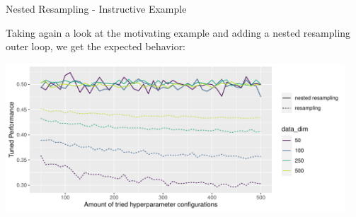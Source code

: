 \documentclass[11pt,compress,t,notes=noshow, xcolor=table]{beamer}
\begin{document}
\begin{vbframe}{Nested Resampling - Instructive Example}

Taking again a look at the motivating example and adding a nested resampling outer loop, we get the expected behavior:

\begin{knitrout}\scriptsize
{}\color{fgcolor}

{\centering \includegraphics[width=0.95\textwidth]{figure/cart_tuning_nestresample_1} 
}


\end{knitrout}


\end{vbframe}
\endlecture
\end{document}
